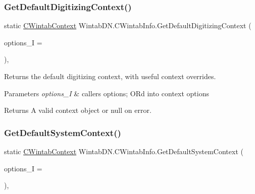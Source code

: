\subsubsection{\texorpdfstring{Get\+Default\+Digitizing\+Context()}{GetDefaultDigitizingContext()}}
{\footnotesize\ttfamily static \mbox{\hyperlink{class_wintab_d_n_1_1_c_wintab_context}{C\+Wintab\+Context}} Wintab\+D\+N.\+C\+Wintab\+Info.\+Get\+Default\+Digitizing\+Context (\begin{DoxyParamCaption}\item[{\mbox{\hyperlink{namespace_wintab_d_n_a701e8021b6889039ed562596a2d1bdd2}{E\+C\+T\+X\+Option\+Values}}}]{options\+\_\+I = {} }\end{DoxyParamCaption})\hspace{0.3cm}{\ttfamily [inline]}, {\ttfamily [static]}}



Returns the default digitizing context, with useful context overrides. 


\begin{DoxyParams}{Parameters}
{\em options\+\_\+I} & caller\textquotesingle{}s options; OR\textquotesingle{}d into context options\\
\hline
\end{DoxyParams}
\begin{DoxyReturn}{Returns}
A valid context object or null on error.
\end{DoxyReturn}
\mbox{\label{class_wintab_d_n_1_1_c_wintab_info_ad514f07b446a92bc1f1fc8154cf66d45}} 
\subsubsection{\texorpdfstring{Get\+Default\+System\+Context()}{GetDefaultSystemContext()}}
{\footnotesize\ttfamily static \mbox{\hyperlink{class_wintab_d_n_1_1_c_wintab_context}{C\+Wintab\+Context}} Wintab\+D\+N.\+C\+Wintab\+Info.\+Get\+Default\+System\+Context (\begin{DoxyParamCaption}\item[{\mbox{\hyperlink{namespace_wintab_d_n_a701e8021b6889039ed562596a2d1bdd2}{E\+C\+T\+X\+Option\+Values}}}]{options\+\_\+I = {} }\end{DoxyParamCaption})\hspace{0.3cm}{\ttfamily [inline]}, {\ttfamily [static]}}



